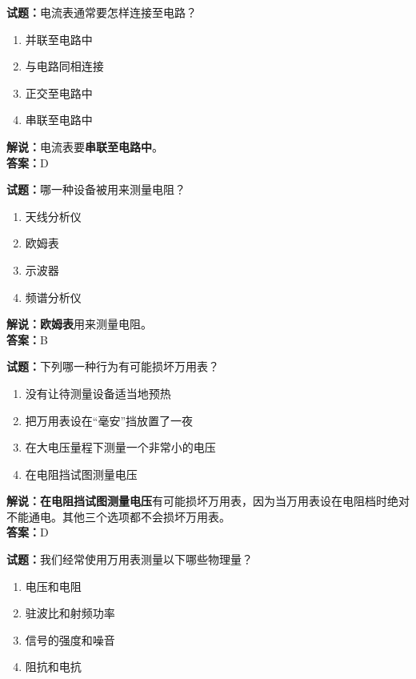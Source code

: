 \documentclass{ctexbook}
\begin{document}
\noindent\textbf{试题：}电流表通常要怎样连接至电路？

\begin{enumerate}[leftmargin=3em]
  \item 并联至电路中
  \item 与电路同相连接
  \item 正交至电路中
  \item 串联至电路中
\end{enumerate}

\noindent\textbf{解说：}电流表要\textbf{串联至电路中}。\\\noindent\textbf{答案：}D

\bigskip

\noindent\textbf{试题：}哪一种设备被用来测量电阻？

\begin{enumerate}[leftmargin=3em]
  \item 天线分析仪
  \item 欧姆表
  \item 示波器
  \item 频谱分析仪
\end{enumerate}

\noindent\textbf{解说：欧姆表}用来测量电阻。\\\noindent\textbf{答案：}B

\bigskip

\noindent\textbf{试题：}下列哪一种行为有可能损坏万用表？

\begin{enumerate}[leftmargin=3em]
  \item 没有让待测量设备适当地预热
  \item 把万用表设在“毫安”挡放置了一夜
  \item 在大电压量程下测量一个非常小的电压
  \item 在电阻挡试图测量电压
\end{enumerate}

\noindent\textbf{解说：在电阻挡试图测量电压}有可能损坏万用表，因为当万用表设在电阻档时绝对不能通电。其他三个选项都不会损坏万用表。\\\noindent\textbf{答案：}D

\bigskip

\noindent\textbf{试题：}我们经常使用万用表测量以下哪些物理量？

\begin{enumerate}[leftmargin=3em]
  \item 电压和电阻
  \item 驻波比和射频功率
  \item 信号的强度和噪音
  \item 阻抗和电抗
\end{enumerate}
\end{document}
